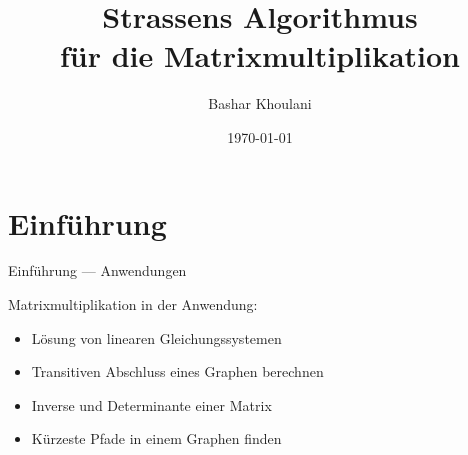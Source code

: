 \documentclass{beamer}
\title[Strassens Algorithmus]{Strassens Algorithmus \\ für die Matrixmultiplikation}
\author{Bashar Khoulani}
\institute[]{Universität Kassel}
\date{\today}
\begin{document}
\begin{frame}
    \titlepage
\end{frame}

\section{Einführung}
\begin{frame}{Einführung --- Anwendungen}
\uncover<+-> {
Matrixmultiplikation in der Anwendung:
\begin{itemize}[<+->]
\item Lösung von linearen Gleichungssystemen
\item Transitiven Abschluss eines Graphen berechnen
\item Inverse und Determinante einer Matrix
\item Kürzeste Pfade in einem Graphen finden
\end{itemize}
}
\end{frame}
\end{document}
